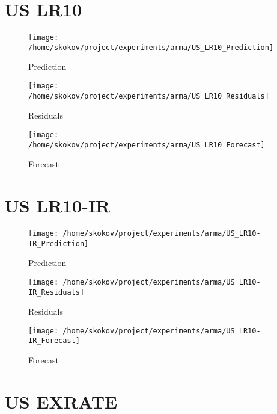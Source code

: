 %
\section{US LR10}%


\begin{figure}[h!]%
\centering%
\texttt{[image: /home/skokov/project/experiments/arma/US\_LR10\_Prediction]}%
\caption{Prediction}%
\label{fig:US_LR10_Prediction}%
\end{figure}

%


\begin{figure}[h!]%
\centering%
\texttt{[image: /home/skokov/project/experiments/arma/US\_LR10\_Residuals]}%
\caption{Residuals}%
\label{fig:US_LR10_Residuals}%
\end{figure}

%


\begin{figure}[h!]%
\centering%
\texttt{[image: /home/skokov/project/experiments/arma/US\_LR10\_Forecast]}%
\caption{Forecast}%
\label{fig:US_LR10_Forecast}%
\end{figure}

%
\section{US LR10{-}IR}%


\begin{figure}[h!]%
\centering%
\texttt{[image: /home/skokov/project/experiments/arma/US\_LR10-IR\_Prediction]}%
\caption{Prediction}%
\label{fig:US_LR10-IR_Prediction}%
\end{figure}

%


\begin{figure}[h!]%
\centering%
\texttt{[image: /home/skokov/project/experiments/arma/US\_LR10-IR\_Residuals]}%
\caption{Residuals}%
\label{fig:US_LR10-IR_Residuals}%
\end{figure}

%


\begin{figure}[h!]%
\centering%
\texttt{[image: /home/skokov/project/experiments/arma/US\_LR10-IR\_Forecast]}%
\caption{Forecast}%
\label{fig:US_LR10-IR_Forecast}%
\end{figure}

%
\section{US EXRATE}%


